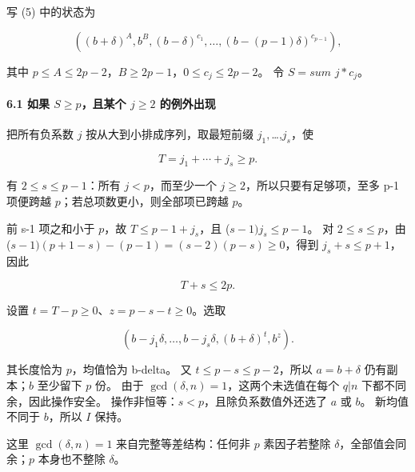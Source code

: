 {写} {(5)} {中的状态为}

\[
((b+\delta)^A,b^B,(b-\delta)^{c_1},\ldots,(b-(p-1)\delta)^{c_{p-1}}),
\]

{其中} {\ensuremath{p\le A\le 2p-2}，\ensuremath{B\ge 2p-1}，\ensuremath{0\le c_{j}\le 2p-2}。} {令} {\ensuremath{S=sum}} {\ensuremath{j*c_{j}}。}

\paragraph*{\texorpdfstring{{6.1} {如果} {\ensuremath{S\ge p}，且某个} {\ensuremath{j\ge 2}} {的例外出现}}{6.1 如果 ，且某个  的例外出现}}\label{C2-h10}

{把所有负系数} {\ensuremath{j}} {按从大到小排成序列，取最短前缀} {\ensuremath{j_{1},}\ldots,\ensuremath{j_{s}}，使}

\[
T=j_1+\cdots+j_s\ge p.
\]

{有} {\ensuremath{2\le s\le p-1}：所有} {\ensuremath{j<p}，而至少一个} {\ensuremath{j\ge 2}，所以只要有足够项，至多} {p-1} {项便跨越} {\ensuremath{p}；若总项数更小，则全部项已跨越} {\ensuremath{p}。}

{前} {s-1} {项之和小于} {\ensuremath{p}，故} {\ensuremath{T\le p-1+j_{s}}，且} {(\ensuremath{s-1)j_{s}\le p-1}。} {对} {\ensuremath{2\le s\le p}，由} {(\ensuremath{s-1)(p+1-s)-(p-1)=(s-2)(p-s)\ge 0}，得到} {\ensuremath{j_{s}+s\le p+1}，因此}

\[
T+s\le2p.
\]

{设置} {\ensuremath{t=T-p\ge 0}、\ensuremath{z=p-s-t\ge 0}。选取}

\[
\boxed{(b-j_1\delta,\ldots,b-j_s\delta,
(b+\delta)^t,b^z).}
\tag{C2.6}
\]

{其长度恰为} {\ensuremath{p}，均值恰为} {b-delta。} {又} {\ensuremath{t\le p-s\le p-2}，所以} {\ensuremath{a=b+\delta }} {仍有副本；\ensuremath{b}} {至少留下} {\ensuremath{p}} {份。} {由于} {\ensuremath{\operatorname{gcd}(\delta ,n)=1}，这两个未选值在每个} {\ensuremath{q|n}} {下都不同余，因此操作安全。} {操作非恒等：\ensuremath{s<p}，且除负系数值外还选了} {\ensuremath{a}} {或} {\ensuremath{b}。} {新均值不同于} {\ensuremath{b}，所以} {\ensuremath{I}} {保持。}

{这里} {\ensuremath{\operatorname{gcd}(\delta ,n)=1}} {来自完整等差结构：任何非} {\ensuremath{p}} {素因子若整除} {\ensuremath{\delta }，全部值会同余；\ensuremath{p}} {本身也不整除} {\ensuremath{\delta }。}

